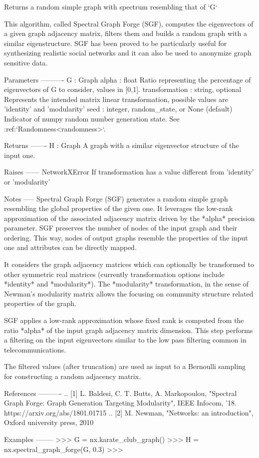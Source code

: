 \begin{DoxyVerb}Returns a random simple graph with spectrum resembling that of `G`

This algorithm, called Spectral Graph Forge (SGF), computes the
eigenvectors of a given graph adjacency matrix, filters them and
builds a random graph with a similar eigenstructure.
SGF has been proved to be particularly useful for synthesizing
realistic social networks and it can also be used to anonymize
graph sensitive data.

Parameters
----------
G : Graph
alpha :  float
    Ratio representing the percentage of eigenvectors of G to consider,
    values in [0,1].
transformation : string, optional
    Represents the intended matrix linear transformation, possible values
    are 'identity' and 'modularity'
seed : integer, random_state, or None (default)
    Indicator of numpy random number generation state.
    See :ref:`Randomness<randomness>`.

Returns
-------
H : Graph
    A graph with a similar eigenvector structure of the input one.

Raises
------
NetworkXError
    If transformation has a value different from 'identity' or 'modularity'

Notes
-----
Spectral Graph Forge (SGF) generates a random simple graph resembling the
global properties of the given one.
It leverages the low-rank approximation of the associated adjacency matrix
driven by the *alpha* precision parameter.
SGF preserves the number of nodes of the input graph and their ordering.
This way, nodes of output graphs resemble the properties of the input one
and attributes can be directly mapped.

It considers the graph adjacency matrices which can optionally be
transformed to other symmetric real matrices (currently transformation
options include *identity* and *modularity*).
The *modularity* transformation, in the sense of Newman's modularity matrix
allows the focusing on community structure related properties of the graph.

SGF applies a low-rank approximation whose fixed rank is computed from the
ratio *alpha* of the input graph adjacency matrix dimension.
This step performs a filtering on the input eigenvectors similar to the low
pass filtering common in telecommunications.

The filtered values (after truncation) are used as input to a Bernoulli
sampling for constructing a random adjacency matrix.

References
----------
..  [1] L. Baldesi, C. T. Butts, A. Markopoulou, "Spectral Graph Forge:
    Graph Generation Targeting Modularity", IEEE Infocom, '18.
    https://arxiv.org/abs/1801.01715
..  [2] M. Newman, "Networks: an introduction", Oxford university press,
    2010

Examples
--------
>>> G = nx.karate_club_graph()
>>> H = nx.spectral_graph_forge(G, 0.3)
>>>
\end{DoxyVerb}
 